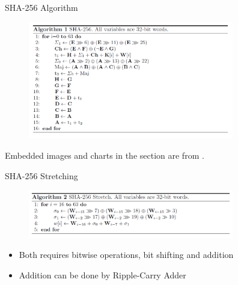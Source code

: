 \documentclass{beamer}
\begin{document}
    \begin{frame}{SHA-256 Algorithm}
        \begin{figure}[h]
            \centering
            \includegraphics[width=0.8\textwidth]{./Images/quant-sha2-circ.png}
        \end{figure}
        Embedded images and charts in the section are from \cite{amy2016estimating}.
    \end{frame}

    \begin{frame}{SHA-256 Stretching}
        \begin{figure}[h]
            \centering
            \includegraphics[width=0.8\textwidth]{./Images/quant-sha2-stretch.png}
        \end{figure}
        \begin{itemize}
            \item Both requires bitwise operations, bit shifting and addition
            \item Addition can be done by Ripple-Carry Adder
        \end{itemize}
    \end{frame}
    
\end{document}
